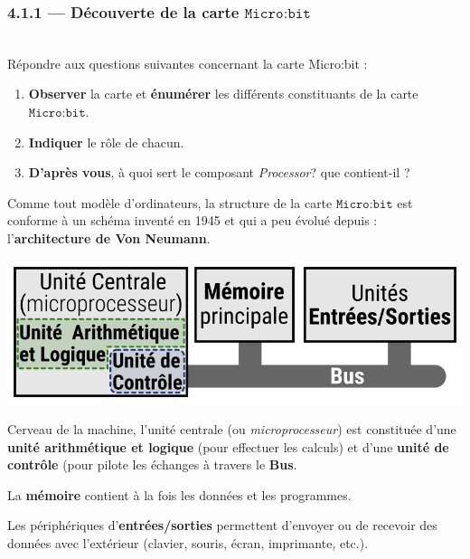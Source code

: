 \documentclass[a4paper,17pt]{extarticle}
\newenvironment{eleve}%
{\begin{activite}\color{noiramu}\\[-0.5cm]}
{\end{activite}}
\providecommand{\tightlist}{%
      \setlength{\itemsep}{0pt}\setlength{\parskip}{0pt}}
\begin{document}
    \hypertarget{duxe9couverte-de-la-carte-textttmicrobit}{%
\subsubsection{\texorpdfstring{4.1.1 --- Découverte de la carte
\(\texttt{Micro:bit}\)}{4.1.1 --- Découverte de la carte \textbackslash texttt\{Micro:bit\}}}\label{duxe9couverte-de-la-carte-textttmicrobit}}
\begin{eleve}
    Répondre aux questions suivantes concernant la carte Micro:bit :

\begin{enumerate}
\def\labelenumi{\arabic{enumi}.}
\tightlist
\item
  \textbf{Observer} la carte et \textbf{énumérer} les différents
  constituants de la carte \(\texttt{Micro:bit}\).
\item
  \textbf{Indiquer} le rôle de chacun.
\item
  \textbf{D'après vous}, à quoi sert le composant \emph{Processor}? que
  contient-il ?
\end{enumerate}
        
        \end{eleve}\begin{retenir}
    Comme tout modèle d'ordinateurs, la structure de la carte
\(\texttt{Micro:bit}\) est conforme à un schéma inventé en 1945 et qui a
peu évolué depuis : l'\textbf{architecture de Von Neumann}.

\includegraphics{./res/archi.png}

Cerveau de la machine, l'unité centrale (ou \emph{microprocesseur}) est
constituée d'une \textbf{unité arithmétique et logique} (pour effectuer
les calculs) et d'une \textbf{unité de contrôle} (pour pilote les
échanges à travers le \textbf{Bus}.

La \textbf{mémoire} contient à la fois les données et les programmes.

Les périphériques d'\textbf{entrées/sorties} permettent d'envoyer ou de
recevoir des données avec l'extérieur (clavier, souris, écran,
imprimante, etc.).

        \end{retenir}
\end{document}
